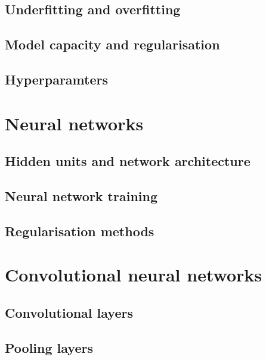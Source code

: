 \documentclass[12pt]{article}
\begin{document}
\subsection{Underfitting and overfitting}

\subsection{Model capacity and regularisation}

\subsection{Hyperparamters}

\section{Neural networks}

\subsection{Hidden units and network architecture}

\subsection{Neural network training}

\subsection{Regularisation methods}

\section{Convolutional neural networks}

\subsection{Convolutional layers}

\subsection{Pooling layers}

\end{document}
